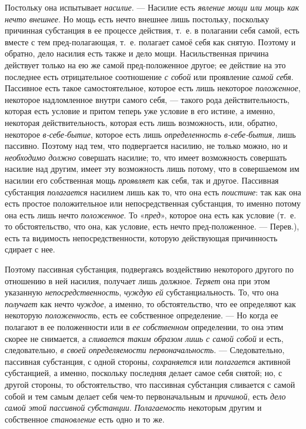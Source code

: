 Постольку она испытывает {\em насилие}. — Насилие есть
{\em явление мощи или мощь как нечто внешнее}. Но мощь
есть нечто внешнее лишь постольку, поскольку причинная субстанция в ее
процессе действия, т.~е. в полагании себя самой, есть вместе с тем
пред-полагающая, т.~е. полагает самоё себя как снятую. Поэтому и обратно,
дело насилия есть также и дело мощи. Насильственная причина действует
только на ею же самой пред-положенное другое; ее действие на это последнее
есть отрицательное соотношение {\em с собой} или
проявление {\em самой себя}. Пассивное есть такое
самостоятельное, которое есть лишь некоторое
{\em положенное}, некоторое надломленное внутри самого
себя, — такого рода действительность, которая есть условие и притом теперь
уже условие в его истине, а именно, некоторая действительность, которая
есть лишь возможность, или, обратно, некоторое
{\em в-себе-бытие}, которое есть лишь
{\em определенность в-себе-бытия}, лишь пассивно.
Поэтому над тем, что подвергается насилию, не только можно, но и
{\em необходимо должно} совершать насилие; то, что
имеет возможность совершать насилие над другим, имеет эту возможность лишь
потому, что в совершаемом им насилии его собственная мощь
{\em проявляет} как себя, так и другое. Пассивная
субстанция {\em полагается} насилием лишь как то, что
она есть {\em поистине}: так как она есть простое
положительное или непосредственная субстанция, то именно потому она есть
лишь нечто {\em положенное}. То
«{\em пред}», которое она есть как условие (т.~е. то
обстоятельство, что она, как условие, есть нечто пред-положенное. —
Перев.), есть та видимость непосредственности, которую действующая
причинность сдирает с нее.

Поэтому пассивная субстанция, подвергаясь воздействию некоторого другого по
отношению в ней насилия, получает лишь должное.
{\em Теряет} она при этом указанную
{\em непосредственность},
{\em чуждую ей} субстанциальность. То, что она
{\em получает} как нечто
{\em чуждое}, а именно, то обстоятельство, что ее
определяют как некоторую {\em положенность}, есть ее
собственное определение. — Но когда ее полагают в ее положенности или в
{\em ее собственном} определении, то она этим скорее не
снимается, а {\em сливается таким образом лишь с самой
собой} и есть, следовательно, {\em в своей
определяемости первоначальность}. — Следовательно, пассивная субстанция, с
одной стороны, {\em сохраняется} или
{\em полагается} активной субстанцией, а именно,
поскольку последняя делает самое себя снятой; но, с другой стороны, то
обстоятельство, что пассивная субстанция сливается с самой собой и тем
самым делает себя чем-то первоначальным и
{\em причиной}, есть {\em дело
самой этой пассивной }{\em субстанции}.
{\em Полагаемость} некоторым другим и собственное
{\em становление} есть одно и то же.

